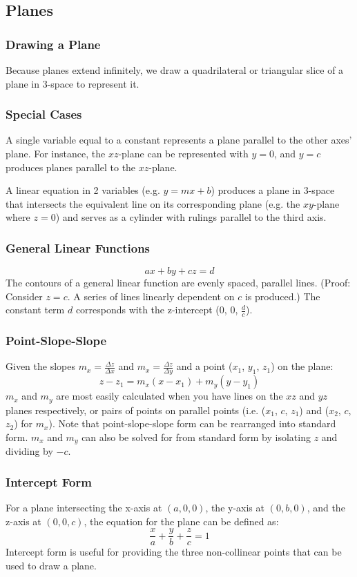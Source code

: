 \documentclass{article}
\begin{document}
\subsection{Planes}
\subsubsection{Drawing a Plane}
Because planes extend infinitely, we draw a quadrilateral or triangular slice of a plane in 3-space to represent it.

\subsubsection{Special Cases}
A single variable equal to a constant represents a plane parallel to the other axes' plane. For instance, the $xz$-plane can be represented with $y=0$, and $y=c$ produces planes parallel to the $xz$-plane.

A linear equation in 2 variables (e.g. $y=mx+b$) produces a plane in 3-space that intersects the equivalent line on its corresponding plane (e.g. the $xy$-plane where $z=0$) and serves as a cylinder with rulings parallel to the third axis.

\subsubsection{General Linear Functions}
$$ax+by+cz=d$$
The contours of a general linear function are evenly spaced, parallel lines. (Proof: Consider $z=c$. A series of lines linearly dependent on $c$ is produced.)
The constant term $d$ corresponds with the z-intercept ($0$, $0$, $\frac{d}{c}$).

\subsubsection{Point-Slope-Slope}
Given the slopes $m_x=\frac{\Delta{z}}{\Delta{x}}$ and $m_x=\frac{\Delta{z}}{\Delta{y}}$ and a point ($x_1$, $y_1$, $z_1$) on the plane:
$$z-z_1 = m_x(x-x_1) + m_y(y-y_1)$$
$m_x$ and $m_y$ are most easily calculated when you have lines on the $xz$ and $yz$ planes respectively, or pairs of points on parallel points (i.e. ($x_1$, $c$, $z_1$) and ($x_2$, $c$, $z_2$) for $m_x$). Note that point-slope-slope form can be rearranged into standard form. $m_x$ and $m_y$ can also be solved for from standard form by isolating $z$ and dividing by $-c$.

\subsubsection{Intercept Form}
For a plane intersecting the x-axis at $(a,0,0)$, the y-axis at $(0,b,0)$, and the z-axis at $(0,0,c)$, the equation for the plane can be defined as:
$$\frac{x}{a}+\frac{y}{b}+\frac{z}{c}=1$$
Intercept form is useful for providing the three non-collinear points that can be used to draw a plane.
\end{document}
